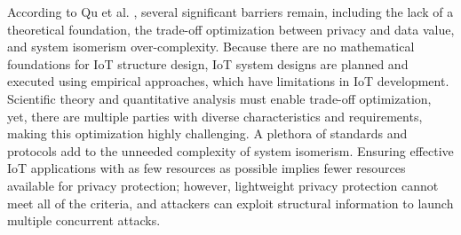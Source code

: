 
According to Qu et al. \cite{Qu2018Privacy}, several significant barriers
remain, including the lack of a theoretical foundation, the trade-off optimization
between privacy and data value, and system isomerism over-complexity. Because
there are no mathematical foundations for IoT structure design, IoT system
designs are planned and executed using empirical approaches, which have
limitations in IoT development. Scientific theory and quantitative analysis
must enable trade-off optimization, yet, there are multiple parties with
diverse characteristics and requirements, making this optimization highly
challenging. A plethora of standards and protocols add to the unneeded complexity
of system isomerism. Ensuring effective IoT applications with as few resources
as possible implies fewer resources available for privacy protection; however,
lightweight privacy protection cannot meet all of the criteria, and attackers
can exploit structural information to launch multiple concurrent attacks.

